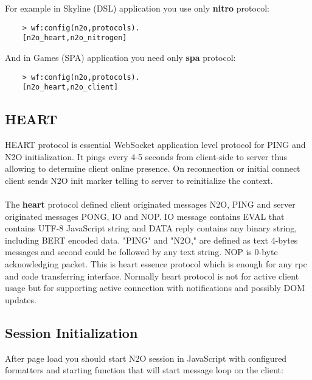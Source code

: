 For example in Skyline (DSL) application you use only {\bf nitro} protocol:

\vspace{1\baselineskip}
\begin{lstlisting}
    > wf:config(n2o,protocols).
    [n2o_heart,n2o_nitrogen]
\end{lstlisting}
\vspace{1\baselineskip}

And in Games (SPA) application you need only {\bf spa} protocol:

\vspace{1\baselineskip}
\begin{lstlisting}
    > wf:config(n2o,protocols).
    [n2o_heart,n2o_client]
\end{lstlisting}
\vspace{1\baselineskip}

\newpage
\subsection{HEART}

HEART protocol is essential WebSocket application level protocol for PING and N2O initialization.
It pings every 4-5 seconds from client-side to server thus allowing to
determine client online presence. On reconnection or initial connect
client sends N2O init marker telling to server to reinitialize the context.

\paragraph{}
The {\bf heart} protocol defined client originated messages N2O, PING
and server originated messages PONG, IO and NOP. IO message contains EVAL
that contains UTF-8 JavaScript string and DATA reply contains any
binary string, including BERT encoded data. "PING" and "N2O," are
defined as text 4-bytes messages and second could be followed by
any text string. NOP is 0-byte acknowledging packet.
This is heart essence protocol which is enough for any rpc and code
transferring interface. Normally heart protocol is not for active
client usage but for supporting active connection with notifications
and possibly DOM updates.

\subsection*{Session Initialization}

After page load you should start N2O session in JavaScript with configured
formatters and starting function that will start message loop on the client:

